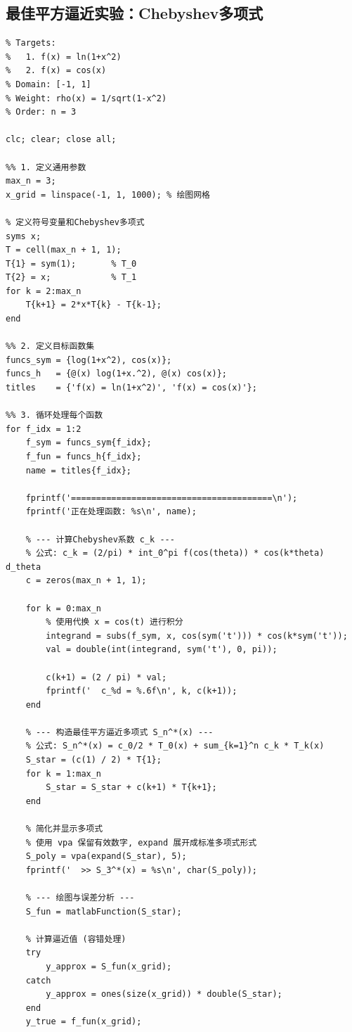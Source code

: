\documentclass[UTF8, a4paper, 11pt]{ctexart}
\begin{document}
\subsection{最佳平方逼近实验：Chebyshev多项式}
\begin{lstlisting}[caption={用Chebyshev多项式对$\cos(x)$和$\ln(1+x^2)$的最佳平方逼近与拟合效果}]
%% 文件名称: bestsquareapproximationChebyshev.m
% Targets: 
%   1. f(x) = ln(1+x^2)
%   2. f(x) = cos(x)
% Domain: [-1, 1]
% Weight: rho(x) = 1/sqrt(1-x^2)
% Order: n = 3

clc; clear; close all;

%% 1. 定义通用参数
max_n = 3;
x_grid = linspace(-1, 1, 1000); % 绘图网格

% 定义符号变量和Chebyshev多项式
syms x;
T = cell(max_n + 1, 1);
T{1} = sym(1);       % T_0
T{2} = x;            % T_1
for k = 2:max_n
    T{k+1} = 2*x*T{k} - T{k-1}; 
end

%% 2. 定义目标函数集
funcs_sym = {log(1+x^2), cos(x)};
funcs_h   = {@(x) log(1+x.^2), @(x) cos(x)};
titles    = {'f(x) = ln(1+x^2)', 'f(x) = cos(x)'};

%% 3. 循环处理每个函数
for f_idx = 1:2
    f_sym = funcs_sym{f_idx};
    f_fun = funcs_h{f_idx};
    name = titles{f_idx};
    
    fprintf('========================================\n');
    fprintf('正在处理函数: %s\n', name);
    
    % --- 计算Chebyshev系数 c_k ---
    % 公式: c_k = (2/pi) * int_0^pi f(cos(theta)) * cos(k*theta) d_theta
    c = zeros(max_n + 1, 1);
    
    for k = 0:max_n
        % 使用代换 x = cos(t) 进行积分
        integrand = subs(f_sym, x, cos(sym('t'))) * cos(k*sym('t'));
        val = double(int(integrand, sym('t'), 0, pi));
        
        c(k+1) = (2 / pi) * val;
        fprintf('  c_%d = %.6f\n', k, c(k+1));
    end
    
    % --- 构造最佳平方逼近多项式 S_n^*(x) ---
    % 公式: S_n^*(x) = c_0/2 * T_0(x) + sum_{k=1}^n c_k * T_k(x)
    S_star = (c(1) / 2) * T{1};
    for k = 1:max_n
        S_star = S_star + c(k+1) * T{k+1};
    end
    
    % 简化并显示多项式
    % 使用 vpa 保留有效数字, expand 展开成标准多项式形式
    S_poly = vpa(expand(S_star), 5);
    fprintf('  >> S_3^*(x) = %s\n', char(S_poly));
    
    % --- 绘图与误差分析 ---
    S_fun = matlabFunction(S_star);
    
    % 计算逼近值 (容错处理)
    try
        y_approx = S_fun(x_grid);
    catch
        y_approx = ones(size(x_grid)) * double(S_star);
    end
    y_true = f_fun(x_grid);
    

\end{lstlisting}
\end{document}
